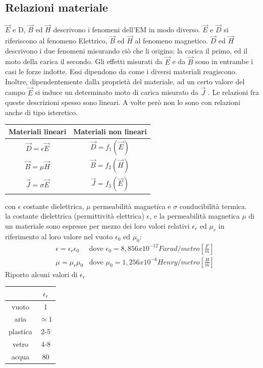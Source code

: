 \documentclass{article}
\begin{document}
\subsection{Relazioni materiale}
$\vec E$ e D, $\vec B$  ed $\vec H$  descrivono i fenomeni dell'EM in modo diverso. $\vec E$ e $\vec D$ si
riferiscono al fenomeno Elettrico, $\vec B$  ed $\vec H$  al fenomeno magnetico. $\vec D$ ed $\vec H$ 
descrivono i due fenomeni misurando ciò che li origina: la carica il primo, ed il
moto della carica il secondo. Gli effetti misurati da $\vec E$ e da $\vec B$  sono in entrambe i
casi le forze indotte. Essi dipendono da come i diversi materiali reagiscono.
Inoltre, dipendentemente dalla proprietà del materiale, ad un certo valore del
campo $\vec E$ si induce un determinato moto di carica misurato da $\vec J$ . Le relazioni
fra queste descrizioni spesso sono lineari. A volte però non lo sono con
relazioni anche di tipo isteretico.
\begin{center}
    \begin{tabular}{|c|c|}
    \hline
    \textbf{Materiali lineari} & \textbf{Materiali non lineari}\\
    \hline 
    $\vec D = \epsilon \vec E$ & $\vec D = f_1(\vec E)$\\
    \hline 
    $\vec B = \mu \vec H$ & $\vec B = f_2(\vec H)$\\
    \hline 
    $\vec J = \sigma \vec E$ & $\vec J = f_3(\vec E)$\\
    \hline
\end{tabular}
\end{center}
con $\epsilon$ costante dielettrica, $\mu$ permeabilità magnetica e $\sigma$ conducibilità termica.
\vspace*{0.1cm}\\
la costante dielettrica (permittività elettrica) $\epsilon$, e la permeabilità magnetica $\mu$
di un materiale sono espresse per mezzo dei loro valori relativi $\epsilon_r$ ed $\mu_r$ in riferimento al loro valore nel vuoto $\epsilon_0$ ed $\mu_0$:
\begin{align*}
    &\epsilon = \epsilon_r \epsilon_0 &\text{dove } \epsilon_0 = 8,856 x 10^{-12} Farad/metro \left[\frac{F}{m}\right]\\
    &\mu = \mu_r \mu_0 &\text{dove } \mu_0 = 1,256 x 10^{-6} Henry/metro \left[\frac{H}{m}\right]
\end{align*}
Riporto alcuni valori di $\epsilon_r$
\begin{center}
    \renewcommand{\arraystretch}{1}
    \begin{tabular}{c|c}
         & $\epsilon_r$\\
        \hline
        vuoto & 1\\
        aria & $\simeq 1$\\
        plastica & 2-5\\
        vetro & 4-8\\
        acqua & 80
    \end{tabular}
\end{center}
\end{document}
